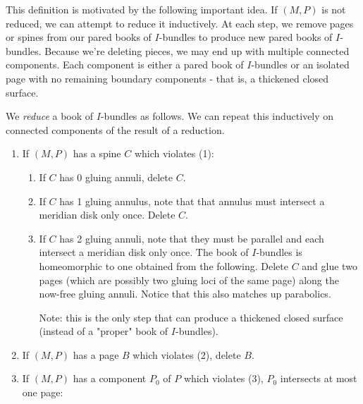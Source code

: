 This definition is motivated by the following important idea. If $(M,P)$ is not
reduced, we can attempt to reduce it inductively. At each step, we remove pages
or spines from our pared books of $I$-bundles to produce new pared books of
$I$-bundles.  Because we're deleting pieces, we may end up with multiple
connected components. Each component is either a pared book of $I$-bundles or an
isolated page with no remaining boundary components - that is, a thickened
closed surface.

\begin{defn}

We \emph{reduce} a book of $I$-bundles as follows. We can repeat this inductively
on connected components of the result of a reduction.

\begin{enumerate}

\item If $(M,P)$ has a spine $C$ which violates (1):

\begin{enumerate}

\item If $C$ has 0 gluing annuli, delete $C$.

\item If $C$ has 1 gluing annulus, note that that annulus must intersect
a meridian disk only once. Delete $C$.

\item If $C$ has 2 gluing annuli, note that they must be parallel and each
intersect a meridian disk only once. The book of $I$-bundles is homeomorphic to
one obtained from the following. Delete $C$ and glue two pages (which are
possibly two gluing loci of the same page) along the now-free gluing annuli.
Notice that this also matches up parabolics.

Note: this is the only step that can produce a thickened closed surface
(instead of a "proper" book of $I$-bundles).

\end{enumerate}

\item If $(M,P)$ has a page $B$ which violates (2), delete $B$.

\item If $(M,P)$ has a component $P_0$ of $P$ which violates (3), $P_0$
intersects at most one page:

\begin{enumerate}


\end{enumerate}
\end{enumerate}
\end{defn}
